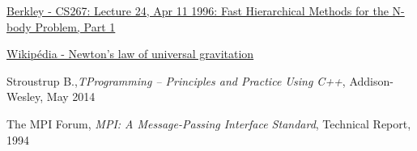 \documentclass[11pt,a4paper]{article}
\begin{document}
\begin{thebibliography}{1}

 \href{http://http.cs.berkeley.edu/~demmel/cs267/lecture26/lecture26.html}{Berkley - CS267: Lecture 24, Apr 11 1996: Fast Hierarchical Methods for the N-body Problem, Part 1}

 \href{https://en.wikipedia.org/wiki/Newton's\_law\_of\_universal\_gravitation}{Wikip\'edia - Newton's law of universal gravitation}

 Stroustrup B.,{\em TProgramming -- Principles and Practice Using C++}, Addison-Wesley, May 2014

 The MPI Forum, {\em MPI: A Message-Passing Interface Standard}, Technical Report, 1994

\end{thebibliography}
\end{document}
